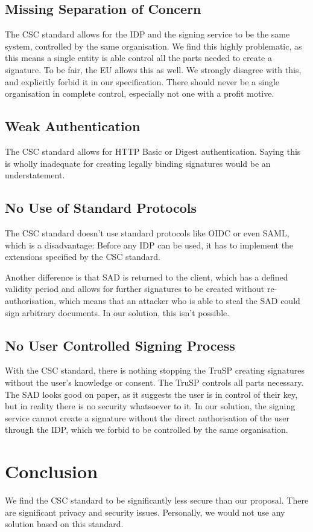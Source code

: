 \subsection{Missing Separation of Concern}
The \gls{CSC} standard allows for the \gls{IDP} and the signing service to be the same system,
controlled by the same organisation.
We find this highly problematic, as this means a single entity is able control all the parts needed to create a signature.
To be fair, the \gls{EU} allows this as well.
We strongly disagree with this, and explicitly forbid it in our specification.
There should never be a single organisation in complete control, especially not one with a profit motive.

\subsection{Weak Authentication}
The \gls{CSC} standard allows for \gls{HTTP} Basic or Digest authentication.
Saying this is wholly inadequate for creating legally binding signatures would be an understatement.

\subsection{No Use of Standard Protocols}
The \gls{CSC} standard doesn't use standard protocols like \gls{OIDC} or even \gls{SAML},
which is a disadvantage:
Before any \gls{IDP} can be used, it has to implement the extensions specified by the \gls{CSC} standard.

Another difference is that \gls{SAD} is returned to the client,
which has a defined validity period and allows for further signatures to be created without re-authorisation,
which means that an attacker who is able to steal the \gls{SAD} could sign arbitrary documents.
In our solution, this isn't possible.

\subsection{No User Controlled Signing Process}
With the \gls{CSC} standard, there is nothing stopping the \gls{TruSP} creating signatures without the user's knowledge or consent.
The \gls{TruSP} controls all parts necessary.
The \gls{SAD} looks good on paper,
as it suggests the user is in control of their key,
but in reality there is no security whatsoever to it.
In our solution, the signing service cannot create a signature without the direct authorisation of the user through the \gls{IDP},
which we forbid to be controlled by the same organisation.

\section{Conclusion}\label{sec:conclusion}
We find the \gls{CSC} standard to be significantly less secure than our proposal.
There are significant privacy and security issues.
Personally, we would not use any solution based on this standard.
